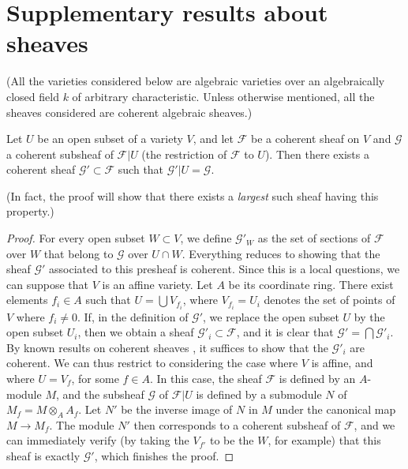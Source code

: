 \documentclass[10pt]{article}
\theoremstyle{plain}
\newenvironment{proposition}[1]
  {\renewcommand\theinnercustomproposition{#1}\innercustomproposition}
  {\endinnercustomproposition}
\theoremstyle{definition}
\newcommand{\sh}{\mathscr}
\newcommand{\oldpage}[1]{\marginpar{\textit{p.~#1}}}
\begin{document}
\section{Supplementary results about sheaves}

(All the varieties considered below are algebraic varieties over an algebraically closed field $k$ of arbitrary characteristic. Unless otherwise mentioned, all the sheaves considered are coherent algebraic sheaves.)

\begin{proposition}{1}
\label{proposition1}
\oldpage{98}
  Let $U$ be an open subset of a variety $V$, and let $\sh{F}$ be a coherent sheaf on $V$ and $\sh{G}$ a coherent subsheaf of $\sh{F}|U$ (the restriction of $\sh{F}$ to $U$).
  Then there exists a coherent sheaf $\sh{G}'\subset\sh{F}$ such that $\sh{G}'|U=\sh{G}$.
\end{proposition}

(In fact, the proof will show that there exists a \emph{largest} such sheaf having this property.)

\begin{proof}
  For every open subset $W\subset V$, we define $\sh{G}'_W$ as the set of sections of $\sh{F}$ over $W$ that belong to $\sh{G}$ over $U\cap W$.
  Everything reduces to showing that the sheaf $\sh{G}'$ associated to this presheaf is coherent.
  Since this is a local questions, we can suppose that $V$ is an affine variety.
  Let $A$ be its coordinate ring.
  There exist elements $f_i\in A$ such that $U=\bigcup V_{f_i}$, where $V_{f_i}=U_i$ denotes the set of points of $V$ where $f_i\neq0$.
  If, in the definition of $\sh{G}'$, we replace the open subset $U$ by the open subset $U_i$, then we obtain a sheaf $\sh{G}'_i\subset\sh{F}$, and it is clear that $\sh{G}'=\bigcap\sh{G}'_i$.
  By known results on coherent sheaves \cite[p.~209]{12}, it suffices to show that the $\sh{G}'_i$ are coherent.
  We can thus restrict to considering the case where $V$ is affine, and where $U=V_f$, for some $f\in A$.
  In this case, the sheaf $\sh{F}$ is defined by an $A$-module $M$, and the subsheaf $\sh{G}$ of $\sh{F}|U$ is defined by a submodule $N$ of $M_f=M\otimes_A A_f$.
  Let $N'$ be the inverse image of $N$ in $M$ under the canonical map $M\to M_f$.
  The module $N'$ then corresponds to a coherent subsheaf of $\sh{F}$, and we can immediately verify (by taking the $V_{f'}$ to be the $W$, for example) that this sheaf is exactly $\sh{G}'$, which finishes the proof.
\end{proof}
\end{document}
